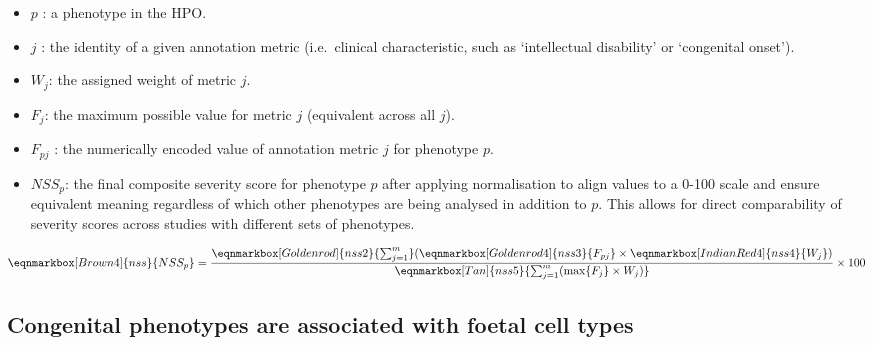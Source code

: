 \documentclass[
]{report}
\begin{document}
\begin{itemize}
\item
  \(p\) : a phenotype in the HPO.
\item
  \(j\) : the identity of a given annotation metric (i.e.~clinical
  characteristic, such as `intellectual disability' or `congenital
  onset').
\item
  \(W_j\): the assigned weight of metric \(j\).
\item
  \(F_j\): the maximum possible value for metric \(j\) (equivalent
  across all \(j\)).
\item
  \(F_{pj}\) : the numerically encoded value of annotation metric \(j\)
  for phenotype \(p\).
\item
  \(NSS_p\): the final composite severity score for phenotype \(p\)
  after applying normalisation to align values to a 0-100 scale and
  ensure equivalent meaning regardless of which other phenotypes are
  being analysed in addition to \(p\). This allows for direct
  comparability of severity scores across studies with different sets of
  phenotypes.
\end{itemize}

\hfill\break
\hfill\break

\begin{equation*}
  \eqnmarkbox[Brown4]{nss}{NSS_p}
  =
  \frac{ 
    \eqnmarkbox[Goldenrod]{nss2}{\sum_{j=1}^{m}} 
    (
      \eqnmarkbox[Goldenrod4]{nss3}{F_{pj}}
      \times 
      \eqnmarkbox[IndianRed4]{nss4}{W_j}
    )
    }{
    \eqnmarkbox[Tan]{nss5}{\sum_{j=1}^{m}(\max\{F_j\} \times W_j)} 
  } \times 100
\end{equation*}

\hfill\break

\subsection{Congenital phenotypes are associated with foetal cell
types}\label{congenital-phenotypes-are-associated-with-foetal-cell-types-1}
\end{document}
